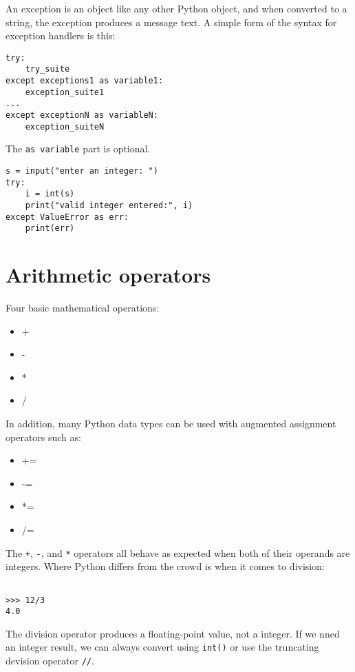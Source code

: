 An exception is an object like any other Python object, and when converted to a string, the exception produces a message text.
A simple form of the syntax for exception handlers is this:
\begin{tcolorbox}
\begin{verbatim}
try:
    try_suite
except exceptions1 as variable1:
    exception_suite1
...
except exceptionN as variableN:
    exception_suiteN
\end{verbatim}
\end{tcolorbox}

The \verb|as variable| part is optional.


\begin{verbatim}
s = input("enter an integer: ")
try:
    i = int(s)
    print("valid integer entered:", i)
except ValueError as err:
    print(err)
\end{verbatim}


\section{Arithmetic operators}

Four basic mathematical operations:
\begin{itemize}
\item +
\item -
\item *
\item /
\end{itemize}

In addition, many Python data types can be used with augmented assignment operators such as:
\begin{itemize}
\item +=
\item -=
\item *=
\item /=
\end{itemize}


The \verb|+|, \verb|-|, and \verb|*| operators all behave as expected when both of their operands are integers.
Where Python differs from the crowd is when it comes to division:
\begin{lstlisting}

>>> 12/3
4.0
\end{lstlisting}


The division operator produces a floating-point value, not a integer.
If we nned an integer result, we can always convert using \verb|int()| or use the truncating devision operator \verb|//|.


